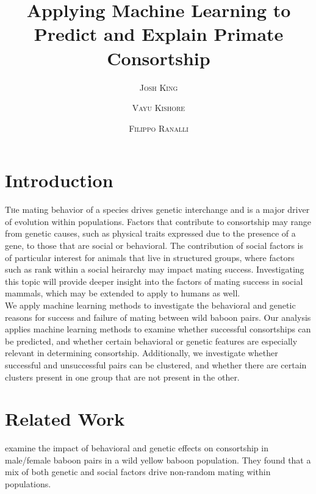 \documentclass[twoside,twocolumn,paper=letter]{article}
\title{Applying Machine Learning to Predict and Explain Primate Consortship} %
\author{%
\textsc{Josh King} \\[1ex] 
\and 
\textsc{Vayu Kishore} \\[1ex] 
\and 
\textsc{Filippo Ranalli} \\[1ex] 
}
\date{} %
\begin{document}
\maketitle


\section{Introduction}

\lettrine[nindent=0em,lines=3]{T} he mating behavior of a species drives genetic
interchange and is a major driver of evolution within populations. Factors that
contribute to consortship may range from genetic causes, such as physical traits
expressed due to the presence of a gene, to those that are social or behavioral.
The contribution of social factors is of particular interest for animals that
live in structured groups, where factors such as rank within a social heirarchy
may impact mating success.  Investigating this topic will provide deeper insight
into the factors of mating success in social mammals, which may be extended to
apply to humans as well.\\

We apply machine learning methods to investigate the behavioral and genetic
reasons for success and failure of mating between wild baboon pairs. Our
analysis applies machine learning methods to examine whether successful
consortships can be predicted, and whether certain behavioral or genetic
features are especially relevant in determining consortship. Additionally, we
investigate whether successful and unsuccessful pairs can be clustered, and
whether there are certain clusters present in one group that are not present in
the other.


\section{Related Work}

\cite{Tung:2012} examine the impact of behavioral and genetic effects on
consortship in male/female baboon pairs in a wild yellow baboon population. They
found that a mix of both genetic and social factors drive non-random mating
within populations.
\end{document}
